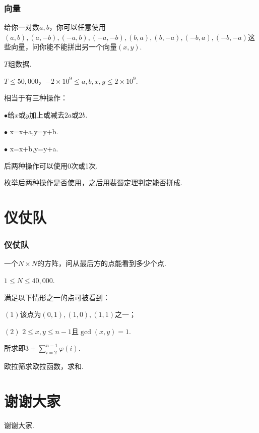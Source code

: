 \documentclass{beamer}
\def\leq{\leqslant}
\def\dou{，\!\!}
\begin{document}
    \begin{frame}[shrink]
        \frametitle{向量}
        \begin{block}

            给你一对数$a,b$\dou 你可以任意使用$(a,b),(a,-b),(-a,b),(-a,-b),(b,a),(b,-a),(-b,a),(-b,-a)$这些向量\dou 问你能不能拼出另一个向量$(x,y)$.\pause

            $T$组数据.\pause

            $T\leq 50,000$\dou $-2\times {10}^9\leq a,b,x,y\leq 2\times {10}^9$.\pause
        \end{block}

        相当于有三种操作：\pause

        $\bullet$给$x$或$y$加上或减去$2a$或$2b$.\pause

        $\bullet$ {\ttfamily x=x+a,y=y+b}.\pause

        $\bullet$ {\ttfamily x=x+b,y=y+a}.\pause

        后两种操作可以使用0次或1次.\pause

        枚举后两种操作是否使用\dou 之后用裴蜀定理判定能否拼成.
    \end{frame}

    \section{仪仗队}

    \begin{frame}[shrink]
        \frametitle{仪仗队}
        \begin{block}

            一个$N\times N$的方阵\dou 问从最后方的点能看到多少个点.\pause

            $1\leq N\leq 40,000$.\pause
        \end{block}

        满足以下情形之一的点可被看到：\pause

        $(1)$该点为$(0,1),(1,0),(1,1)$之一；\pause

        $(2)$ $2\leq x,y\leq n-1$且$\gcd(x,y)=1$.\pause

        所求即$\displaystyle 3+\sum_{i=2}^{n-1}\varphi(i)$.\pause

        欧拉筛求欧拉函数\dou 求和.
    \end{frame}

    \section*{谢谢大家}

    \begin{frame}
        谢谢大家.
    \end{frame}
\end{document}
